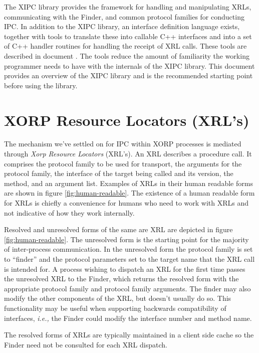 \documentclass[11pt]{article}
\newcommand{\ie}{\emph{i.e.,}\xspace}
\begin{document}
The XIPC library provides the framework for handling and manipulating
XRLs, communicating with the Finder, and common protocol families for
conducting IPC.  In addition to the XIPC library, an interface
definition language exists, together with tools to translate these
into callable C++ interfaces and into a set of C++ handler routines
for handling the receipt of XRL calls.  These tools are described in
document \cite{xorp:xrl_interfaces}.  The tools reduce the amount of
familiarity the working programmer needs to have with the internals of
the XIPC library.  This document provides an overview of the XIPC
library and is the recommended starting point before using the
library.

\section{XORP Resource Locators (XRL's)}

The mechanism we've settled on for IPC within XORP processes is mediated
through \emph{Xorp Resource Locators} (XRL's).  An XRL describes a
procedure call.  It comprises the protocol family to be used for
transport, the arguments for the protocol family, the interface of the
target being called and its version, the method, and an argument
list.  Examples of XRLs in their human readable forms are shown in
figure \ref{fig:human-readable}.  The existence of a human readable
form for XRLs is chiefly a convenience for humans who need to work
with XRLs and not indicative of how they work internally.

Resolved and unresolved forms of the same are XRL are depicted in
figure \ref{fig:human-readable}.  The unresolved form is the starting
point for the majority of inter-process communication.  In the
unresolved form the protocol family is set to ``finder'' and the
protocol parameters set to the target name that the XRL call is
intended for.  A process wishing to dispatch an XRL for the first time
passes the unresolved XRL to the Finder, which returns the resolved
form with the appropriate protocol family and protocol family
arguments.  The finder may also modify the other components of the
XRL, but doesn't usually do so.  This functionality may be useful when
supporting backwards compatibility of interfaces, \ie the Finder could
modify the interface number and method name.

The resolved forms of XRLs are typically maintained in a client side
cache so the Finder need not be consulted for each XRL dispatch.
\end{document}

